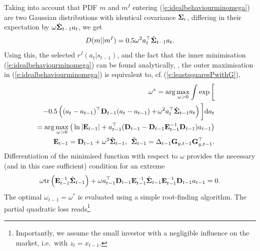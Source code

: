 Taking into account that PDF $m$ and $m^{I}$ entering (\ref{e:idealbehaviourminomega})  are two Gaussian distributions with identical covariance $\mathbf{\Sigma}_{\epsilon}$, differing in their expectation by $\omega \hat{\mathbf{\Sigma}}_{t-1}a_{t}$, we get
\begin{equation*}
D(m||m^{I}) = 0.5\omega^{2}a^{\top}_{t}\hat{\mathbf{\Sigma}}_{t-1}a_{t}.
\end{equation*}
Using this, the selected $r^I(a_{t}|s_{t-1})$, and the fact that the inner minimisation (\ref{e:idealbehaviourminomega}) can be found analytically, \cite{Kar:960280},  the outer maximisation in (\ref{e:idealbehaviourminomega}) is equivalent to, cf.\,(\ref{e:leastsquaresPwithG}),
\begin{eqnarray}
\nonumber
&&\hspace*{-5.0ex}\omega^{\ast}= \mathrm{arg} \max_{\omega> 0}\int \exp\bigg[\\
\nonumber
&&\hspace*{-5.0ex}-0.5\left((a_{t} - a_{t-1})^{\top}\mat{D}_{t-1}(a_{t}-a_{t-1}) +\hspace*{-0.3ex}\omega^{2}a^{\top}_{t}\hat{\mat{\Sigma}}_{t-1}a_{t}\right)\bigg]\mathrm{d}a_{t}\\
\nonumber
&&\hspace*{-5.0ex}=\mathrm{arg} \max_{\omega> 0}\big(\ln|\mat{E}_{t-1}| + a_{t-1}^{\top}(\mat{D}_{t-1} - \mat{D}_{t-1}\mat{E}^{-1}_{t-1}\mat{D}_{t-1})a_{t-1}\big)\\
\nonumber
&&\hspace*{-5.0ex}\mat{E}_{t-1} = \mat{D}_{t-1} +\omega^2\hat{\mat{\Sigma}}_{t-1},\hspace*{1ex}\hat{\mat{\Sigma}}_{t-1}=\Delta_{t-1}\mat{G}_{y,t-1}\mat{G}^{\top}_{y,t-1}.
\end{eqnarray}
Differentiation of the minimised function with respect to $\omega$ provides the necessary (and in this case sufficient) condition for an extreme
\begin{equation*}
\omega\text{tr}\left(\mathbf{E}^{-1}_{t-1}\hat{\mathbf{\Sigma}}_{t-1}\right) +\omega a_{t-1}^{\top}\mathbf{D}_{t-1}\mathbf{E}^{-1}_{t-1}\hat{\mathbf{\Sigma}}_{t-1}\mathbf{E}^{-1}_{t-1}\mathbf{D}_{t-1}a_{t-1}=0.
\end{equation*}
The optimal $\omega_{t-1}=\omega^{\ast}$ is evaluated using a simple root-finding algorithm.   The partial quadratic loss reads\footnote{Importantly, we assume the small investor with a negligible influence on the market, i.e.\
with $z_{t}=x_{t-1}$.}

